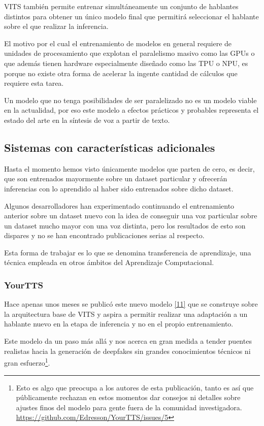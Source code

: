 VITS también permite entrenar simultáneamente un conjunto de hablantes distintos para obtener un único modelo final que permitirá seleccionar el hablante sobre el que realizar la inferencia. 

El motivo por el cual el entrenamiento de modelos en general requiere de unidades de procesamiento que explotan el paralelismo masivo como las GPUs o que además tienen hardware especialmente diseñado como las TPU o NPU, es porque no existe otra forma de acelerar la ingente cantidad de cálculos que requiere esta tarea.

Un modelo que no tenga posibilidades de ser paralelizado no es un modelo viable en la actualidad, por eso este modelo a efectos prácticos y probables representa el estado del arte en la síntesis de voz a partir de texto.

\subsection{Sistemas con características adicionales}

Hasta el momento hemos visto únicamente modelos que parten de cero, es decir, que son entrenados mayormente sobre un dataset particular y ofrecerán inferencias con lo aprendido al haber sido entrenados sobre dicho dataset.

Algunos desarrolladores han experimentado continuando el entrenamiento anterior sobre un dataset nuevo con la idea de conseguir una voz particular sobre un dataset mucho mayor con una voz distinta, pero los resultados de esto son dispares y no se han encontrado publicaciones serias al respecto. 

Esta forma de trabajar es lo que se denomina transferencia de aprendizaje, una técnica empleada en otros ámbitos del Aprendizaje Computacional.

\subsubsection{YourTTS}

Hace apenas unos meses se publicó este nuevo modelo  \hyperref[EA_9]{[11]} que se construye sobre la arquitectura base de VITS y aspira a permitir realizar una adaptación a un hablante nuevo en la etapa de inferencia y no en el propio entrenamiento.

Este modelo da un paso más allá y nos acerca en gran medida a tender puentes realistas hacia la generación de deepfakes sin grandes conocimientos técnicos ni gran esfuerzo\footnote{Esto es algo que preocupa a los autores de esta publicación, tanto es así que públicamente rechazan en estos momentos dar consejos ni detalles sobre ajustes finos del modelo para gente fuera de la comunidad investigadora. \url{https://github.com/Edresson/YourTTS/issues/5}}.


